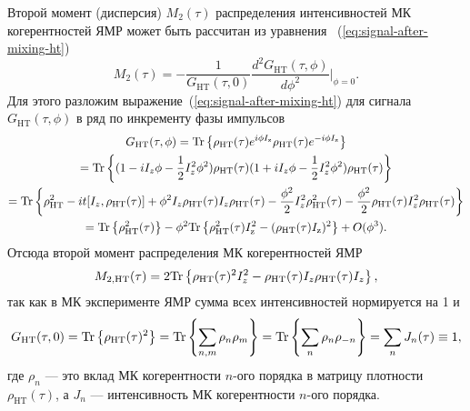 Второй момент (дисперсия) $M_2(\tau)$ распределения интенсивностей МК когерентностей ЯМР может быть рассчитан из уравнения ~(\ref{eq:signal-after-mixing-ht})
\begin{equation}\label{eq:m2-derivative}
  M_2(\tau)
  = -\frac{1}{G_\mathrm{HT}(\tau, 0)}
    \frac{d^2 G_\mathrm{HT}(\tau, \phi)}{d\phi^2}\bigg|_{\phi=0}.
\end{equation}
%
Для этого разложим выражение~(\ref{eq:signal-after-mixing-ht})
для сигнала~$G_\mathrm{HT}(\tau,\phi)$ в ряд по инкременту фазы импульсов
%
\begin{multline}
  G_\mathrm{HT}(\tau,\phi)
  = \mathrm{Tr} \left\{ 
    \rho_\mathrm{HT}(\tau) e^{i \phi I_\mathrm{z} }
    \rho_\mathrm{HT}(\tau) e^{-i\phi I_\mathrm{z} }
   \right\} \\
  =  \mathrm{Tr} \left\{ 
    (1 - iI_z\phi - \frac{1}{2} I_z^2 \phi^2)
    \rho_\mathrm{HT}(\tau)
    (1 + iI_z\phi - \frac{1}{2} I_z^2 \phi^2)
    \rho_\mathrm{HT}(\tau)
   \right\} \\
  = \mathrm{Tr} \left\{ 
    \rho_\mathrm{HT}^2
    - it [I_z,\rho_\mathrm{HT}(\tau)]
    + \phi^2 I_z \rho_\mathrm{HT}(\tau) I_z \rho_\mathrm{HT}(\tau)
    - \frac{\phi^2}{2} I_z^2 \rho_\mathrm{HT}^2(\tau)
    - \frac{\phi^2}{2} \rho_\mathrm{HT}(\tau) I_z^2 \rho_\mathrm{HT}(\tau)
   \right\} \\
  = \mathrm{Tr} \left\{  \rho_\mathrm{HT}^2(\tau)  \right\}
  - \phi^2 \mathrm{Tr} \left\{ 
    \rho_\mathrm{HT}^2(\tau) I^2_\mathrm{z}
    - (\rho_\mathrm{HT}(\tau) I_\mathrm{z})^2
   \right\}
  + O(\phi^3).
\end{multline}
%
Отсюда второй момент распределения МК когерентностей ЯМР
%
\begin{equation}\label{eq:m2-trace}
  M_{2,\mathrm{HT}}(\tau) = 2 \mathrm{Tr} \left\{ 
    \rho_\mathrm{HT}(\tau)^2 I_z^2
    - \rho_\mathrm{HT}(\tau) I_z \rho_\mathrm{HT}(\tau) I_z
   \right\},
\end{equation}
%
так как в МК эксперименте ЯМР сумма всех интенсивностей нормируется на 1
и
\begin{equation}\label{eq:mq-coherences-sum}
  G_\mathrm{HT}(\tau, 0)
  = \mathrm{Tr} \left\{ \rho_\mathrm{HT}(\tau)^2 \right\}
  = \mathrm{Tr} \left\{ \sum\limits_{n,m} \rho_n \rho_m \right\}
  = \mathrm{Tr} \left\{ \sum\limits_{n} \rho_n \rho_{-n} \right\}
  = \sum_n J_n (\tau) \equiv 1,
\end{equation}
где $\rho_n$ --- это вклад МК когерентности $n$-ого порядка в матрицу плотности $\rho_\mathrm{HT}(\tau)$,
а $J_n$ --- интенсивность МК когерентности $n$-ого порядка.
